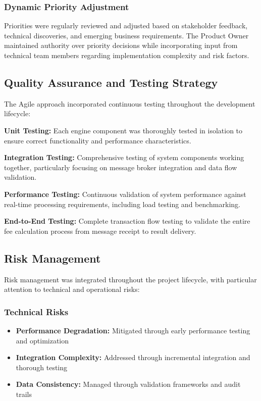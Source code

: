 \subsubsection{Dynamic Priority Adjustment}

Priorities were regularly reviewed and adjusted based on stakeholder feedback, technical discoveries, and emerging business requirements. The Product Owner maintained authority over priority decisions while incorporating input from technical team members regarding implementation complexity and risk factors.

\subsection{Quality Assurance and Testing Strategy}

The Agile approach incorporated continuous testing throughout the development lifecycle:

\textbf{Unit Testing:} Each engine component was thoroughly tested in isolation to ensure correct functionality and performance characteristics.

\textbf{Integration Testing:} Comprehensive testing of system components working together, particularly focusing on message broker integration and data flow validation.

\textbf{Performance Testing:} Continuous validation of system performance against real-time processing requirements, including load testing and benchmarking.

\textbf{End-to-End Testing:} Complete transaction flow testing to validate the entire fee calculation process from message receipt to result delivery.

\subsection{Risk Management}

Risk management was integrated throughout the project lifecycle, with particular attention to technical and operational risks:

\subsubsection{Technical Risks}

\begin{itemize}
    \item \textbf{Performance Degradation:} Mitigated through early performance testing and optimization
    \item \textbf{Integration Complexity:} Addressed through incremental integration and thorough testing
    \item \textbf{Data Consistency:} Managed through validation frameworks and audit trails
\end{itemize}

